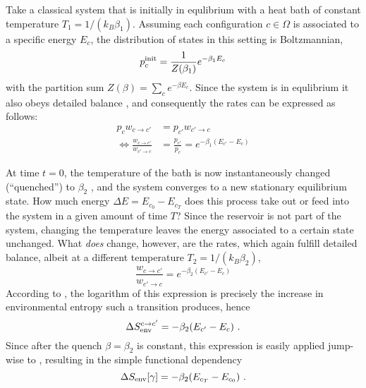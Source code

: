 Take a classical system that is initially in equlibrium with a heat bath of constant temperature \(T_1 = 1/(k_B\beta_1)\). Assuming each configuration \(c\in\Omega\) is associated to a specific energy \(E_c\), the distribution of states in this setting is Boltzmannian,
%
\begin{equation}
	p_c^{\text{init}} = \frac1{Z(\beta_1)}e^{-\beta_1E_c}
\end{equation}
%
with the partition sum \(Z(\beta) = \sum_ce^{-\beta E_c}\). Since the system is in equlibrium it also obeys detailed balance , and consequently the rates can be expressed as follows:
%
\begin{align}
	p_c w_{c\to c'} &= p_{c'} w_{c'\to c}
	\\
	\Leftrightarrow
		   \frac{w_{c\to c'}}{w_{c'\to c}}
		&= \frac{p_{c'}}{p_c}
		 = e^{-\beta_1(E_{c'}-E_c)}
\end{align}

At time \(t = 0\), the temperature of the bath is now instantaneously changed (``quenched'') to \(\beta_2\) , and the system converges to a new stationary equilibrium state. How much energy \(\Delta E = E_{c_0} - E_{c_T}\) does this process take out or feed into the system in a given amount of time \(T\)?
Since the reservoir is not part of the system, changing the temperature leaves the energy associated to a certain state unchanged. What \emph{does} change, however, are the rates, which again fulfill detailed balance, albeit at a different temperature \(T_2 = 1/(k_B\beta_2)\),
%
\begin{equation}
	\frac{w_{c\to c'}}{w_{c'\to c}}
	= e^{-\beta_2(E_{c'}-E_c)}
\end{equation}
%
According to , the logarithm of this expression is precisely the increase in environmental entropy such a transition produces, hence
%
\begin{equation}
	\Delta S_\text{env}^{c\to c'} = -\beta_2(E_{c'}-E_c) ~.
\end{equation}
%
Since after the quench \(\beta = \beta_2\) is constant, this expression is easily applied jump-wise to , resulting in the simple functional dependency
%
\begin{equation}
	\label{eqn:Delta SEnv in terms of energies}
	\Delta S_\text{env}[\gamma] = -\beta_2(E_{c_T}-E_{c_0}) ~.
\end{equation}
%

